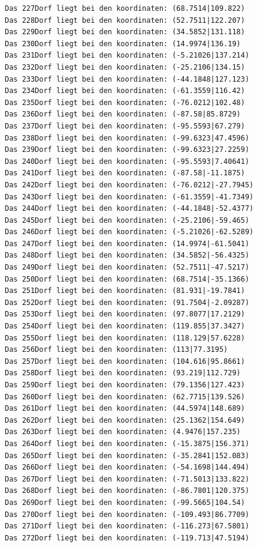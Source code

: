 \documentclass{article}
\begin{document}
\begin{verbatim}
Das 227Dorf liegt bei den koordinaten: (68.7514|109.822)
Das 228Dorf liegt bei den koordinaten: (52.7511|122.207)
Das 229Dorf liegt bei den koordinaten: (34.5852|131.118)
Das 230Dorf liegt bei den koordinaten: (14.9974|136.19)
Das 231Dorf liegt bei den koordinaten: (-5.21026|137.214)
Das 232Dorf liegt bei den koordinaten: (-25.2106|134.15)
Das 233Dorf liegt bei den koordinaten: (-44.1848|127.123)
Das 234Dorf liegt bei den koordinaten: (-61.3559|116.42)
Das 235Dorf liegt bei den koordinaten: (-76.0212|102.48)
Das 236Dorf liegt bei den koordinaten: (-87.58|85.8729)
Das 237Dorf liegt bei den koordinaten: (-95.5593|67.279)
Das 238Dorf liegt bei den koordinaten: (-99.6323|47.4596)
Das 239Dorf liegt bei den koordinaten: (-99.6323|27.2259)
Das 240Dorf liegt bei den koordinaten: (-95.5593|7.40641)
Das 241Dorf liegt bei den koordinaten: (-87.58|-11.1875)
Das 242Dorf liegt bei den koordinaten: (-76.0212|-27.7945)
Das 243Dorf liegt bei den koordinaten: (-61.3559|-41.7349)
Das 244Dorf liegt bei den koordinaten: (-44.1848|-52.4377)
Das 245Dorf liegt bei den koordinaten: (-25.2106|-59.465)
Das 246Dorf liegt bei den koordinaten: (-5.21026|-62.5289)
Das 247Dorf liegt bei den koordinaten: (14.9974|-61.5041)
Das 248Dorf liegt bei den koordinaten: (34.5852|-56.4325)
Das 249Dorf liegt bei den koordinaten: (52.7511|-47.5217)
Das 250Dorf liegt bei den koordinaten: (68.7514|-35.1366)
Das 251Dorf liegt bei den koordinaten: (81.931|-19.7841)
Das 252Dorf liegt bei den koordinaten: (91.7504|-2.09287)
Das 253Dorf liegt bei den koordinaten: (97.8077|17.2129)
Das 254Dorf liegt bei den koordinaten: (119.855|37.3427)
Das 255Dorf liegt bei den koordinaten: (118.129|57.6228)
Das 256Dorf liegt bei den koordinaten: (113|77.3195)
Das 257Dorf liegt bei den koordinaten: (104.616|95.8661)
Das 258Dorf liegt bei den koordinaten: (93.219|112.729)
Das 259Dorf liegt bei den koordinaten: (79.1356|127.423)
Das 260Dorf liegt bei den koordinaten: (62.7715|139.526)
Das 261Dorf liegt bei den koordinaten: (44.5974|148.689)
Das 262Dorf liegt bei den koordinaten: (25.1362|154.649)
Das 263Dorf liegt bei den koordinaten: (4.9476|157.235)
Das 264Dorf liegt bei den koordinaten: (-15.3875|156.371)
Das 265Dorf liegt bei den koordinaten: (-35.2841|152.083)
Das 266Dorf liegt bei den koordinaten: (-54.1698|144.494)
Das 267Dorf liegt bei den koordinaten: (-71.5013|133.822)
Das 268Dorf liegt bei den koordinaten: (-86.7801|120.375)
Das 269Dorf liegt bei den koordinaten: (-99.5665|104.54)
Das 270Dorf liegt bei den koordinaten: (-109.493|86.7709)
Das 271Dorf liegt bei den koordinaten: (-116.273|67.5801)
Das 272Dorf liegt bei den koordinaten: (-119.713|47.5194)

\end{verbatim}
\end{document}
